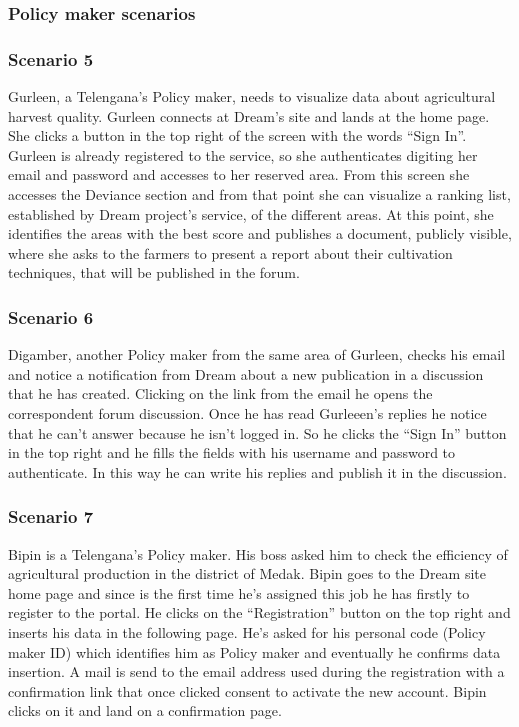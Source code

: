 \subsubsection{Policy maker scenarios}
\subsubsection*{Scenario 5}
Gurleen, a Telengana’s Policy maker, needs to visualize data about agricultural harvest quality. Gurleen connects at Dream’s site and lands at the home page. She clicks a button in the top right of the screen with the words “Sign In”. Gurleen is already registered to the service, so she authenticates digiting her email and password and accesses to her reserved area. From this screen she accesses the Deviance section and from that point she can visualize a ranking list, established by Dream project’s service, of the different areas. At this point, she identifies the areas with the best score and publishes a document, publicly visible, where she asks to the farmers to present a report about their cultivation techniques, that will be published in the forum.

\subsubsection*{Scenario 6}
Digamber, another Policy maker from the same area of Gurleen, checks his email and notice a notification from Dream about a new publication in a discussion that he has created. Clicking on the link from the email he opens the correspondent forum discussion. Once he has read Gurleeen’s replies he notice that he can’t answer because he isn’t logged in. So he clicks the “Sign In” button in the top right and he fills the fields with his username and password to authenticate. In this way he can write his replies and publish it in the discussion.

\subsubsection*{Scenario 7}
Bipin is a Telengana’s Policy maker. His boss asked him to check the efficiency of agricultural production in the district of Medak. Bipin goes to the Dream site home page and since is the first time he’s assigned this job he has firstly to register to the portal. He clicks on the “Registration” button on the top right and inserts his data in the following page. He’s asked for his personal code (Policy maker ID) which identifies him as Policy maker and eventually he confirms data insertion. A mail is send to the email address used during the registration with a confirmation link that once clicked consent to activate the new account. Bipin clicks on it and land on a confirmation page.

